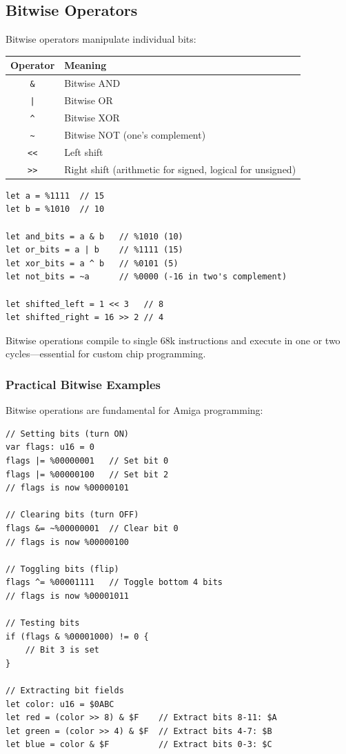 \subsection{Bitwise Operators}

Bitwise operators manipulate individual bits:

\begin{center}
\begin{tabular}{cl}
\textbf{Operator} & \textbf{Meaning} \\
\hline
\texttt{\&} & Bitwise AND \\
\texttt{|} & Bitwise OR \\
\texttt{\textasciicircum} & Bitwise XOR \\
\texttt{\textasciitilde} & Bitwise NOT (one's complement) \\
\texttt{<<} & Left shift \\
\texttt{>>} & Right shift (arithmetic for signed, logical for unsigned) \\
\end{tabular}
\end{center}

\begin{lstlisting}
let a = %1111  // 15
let b = %1010  // 10

let and_bits = a & b   // %1010 (10)
let or_bits = a | b    // %1111 (15)
let xor_bits = a ^ b   // %0101 (5)
let not_bits = ~a      // %0000 (-16 in two's complement)

let shifted_left = 1 << 3   // 8
let shifted_right = 16 >> 2 // 4
\end{lstlisting}

Bitwise operations compile to single 68k instructions and execute in one or two cycles---essential for custom chip programming.

\subsubsection{Practical Bitwise Examples}

Bitwise operations are fundamental for Amiga programming:

\begin{lstlisting}
// Setting bits (turn ON)
var flags: u16 = 0
flags |= %00000001   // Set bit 0
flags |= %00000100   // Set bit 2
// flags is now %00000101

// Clearing bits (turn OFF)
flags &= ~%00000001  // Clear bit 0
// flags is now %00000100

// Toggling bits (flip)
flags ^= %00001111   // Toggle bottom 4 bits
// flags is now %00001011

// Testing bits
if (flags & %00001000) != 0 {
    // Bit 3 is set
}

// Extracting bit fields
let color: u16 = $0ABC
let red = (color >> 8) & $F    // Extract bits 8-11: $A
let green = (color >> 4) & $F  // Extract bits 4-7: $B
let blue = color & $F          // Extract bits 0-3: $C
\end{lstlisting}

